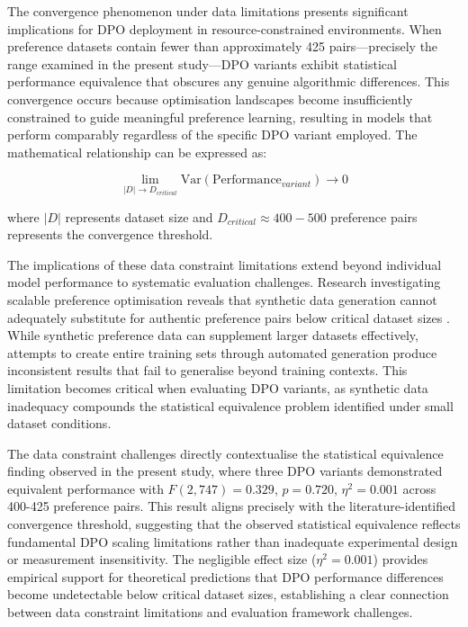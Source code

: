 The convergence phenomenon under data limitations presents significant implications for DPO deployment in resource-constrained environments. When preference datasets contain fewer than approximately 425 pairs—precisely the range examined in the present study—DPO variants exhibit statistical performance equivalence that obscures any genuine algorithmic differences. This convergence occurs because optimisation landscapes become insufficiently constrained to guide meaningful preference learning, resulting in models that perform comparably regardless of the specific DPO variant employed. The mathematical relationship can be expressed as:

$$\lim_{|D| \to D_{critical}} \text{Var}(\text{Performance}_{variant}) \to 0$$

where $|D|$ represents dataset size and $D_{critical} \approx 400-500$ preference pairs represents the convergence threshold.

The implications of these data constraint limitations extend beyond individual model performance to systematic evaluation challenges. Research investigating scalable preference optimisation reveals that synthetic data generation cannot adequately substitute for authentic preference pairs below critical dataset sizes \cite{karthik2024scalable_ranked_preference}. While synthetic preference data can supplement larger datasets effectively, attempts to create entire training sets through automated generation produce inconsistent results that fail to generalise beyond training contexts. This limitation becomes critical when evaluating DPO variants, as synthetic data inadequacy compounds the statistical equivalence problem identified under small dataset conditions.

The data constraint challenges directly contextualise the statistical equivalence finding observed in the present study, where three DPO variants demonstrated equivalent performance with $F(2,747) = 0.329$, $p = 0.720$, $\eta^2 = 0.001$ across 400-425 preference pairs. This result aligns precisely with the literature-identified convergence threshold, suggesting that the observed statistical equivalence reflects fundamental DPO scaling limitations rather than inadequate experimental design or measurement insensitivity. The negligible effect size ($\eta^2 = 0.001$) provides empirical support for theoretical predictions that DPO performance differences become undetectable below critical dataset sizes, establishing a clear connection between data constraint limitations and evaluation framework challenges.

